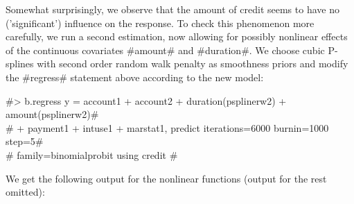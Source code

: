 \normalsize

Somewhat surprisingly, we observe that the amount of credit seems to
have no ('significant') influence on the response. To check this
phenomenon more carefully, we run a second estimation, now allowing
for possibly nonlinear effects of the continuous covariates #amount#
and #duration#. We choose cubic P-splines with second order random
walk penalty as smoothness priors and modify the #regress# statement
above according to the new model:

#> b.regress  y = account1 + account2 + duration(psplinerw2) + amount(psplinerw2)# \\
#  + payment1 + intuse1 + marstat1, predict iterations=6000 burnin=1000 step=5# \\
#  family=binomialprobit using credit #

We get the following output for the nonlinear functions (output for
the rest omitted):

\small

